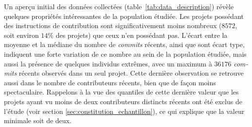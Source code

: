 \documentclass[dvipsnames]{llncs}
\newcommand{\en}[1]{\foreignlanguage{english}{\emph{#1}}}
\begin{document}
    Un aperçu initial des données collectées (table~\ref{tab:data_description}) révèle quelques propriétés
    intéressantes de la population étudiée. Les projets possédant des instructions de contribution sont
    significativement moins nombreux ($8 572$, soit environ $14\%$ des projets) que ceux n'en possédant pas.
    L'écart entre la moyenne et la médiane du nombre de \en{commits} récents, ainsi que sont écart type,
    indiquent une forte variation de ce nombre au sein de la population étudiée, mais aussi la présence de
    quelques individus extrêmes, avec un maximum à $36 176$ \en{commits} récents observés dans un seul projet.
    Cette dernière observation se retrouve aussi dans le nombre de contributeurs récents, bien que de façon
    moins spectaculaire. Rappelons à la vue des quantiles de cette dernière valeur que les projets ayant vu
    moins de deux contributeurs distincts récents ont été exclus de l'étude (voir section
    \ref{sec:constitution_echantillon}), ce qui explique que la valeur minimale soit de deux.
\end{document}
